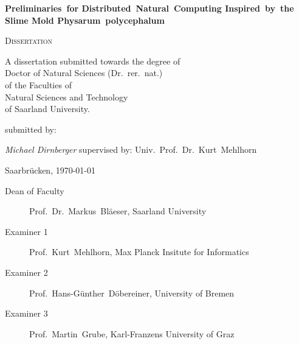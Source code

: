 
\begin{titlepage}
	\centering
	\vfill

	{\huge\bfseries Preliminaries~for Distributed~Natural~Computing Inspired~by~the Slime Mold Physarum~polycephalum\par}


	\vfill

	{\scshape\Large Dissertation}
	\vfill



	{\large A dissertation submitted towards the degree of\\ 
	Doctor of Natural Sciences (Dr.~rer.~nat.)\\
	of the Faculties of\\
	Natural Sciences and Technology\\
	of Saarland University.}
	
	\vfill
	submitted by:
	\vfill

	{\Large\itshape Michael Dirnberger}
	\vfill
	supervised by:
	\vfill
	Univ.~Prof.~Dr.~Kurt~Mehlhorn

	\vfill

	{\large Saarbr\"ucken, \today}
\end{titlepage}


 \begin{description}
 	\item[Dean of Faculty] Prof.~Dr.~Markus~Bl\"aeser, Saarland University
	\item[Examiner 1] Prof.~Kurt~Mehlhorn, Max Planck Insitute for Informatics
	\item[Examiner 2] Prof.~Hans-G\"unther~D\"obereiner, University of Bremen
	\item[Examiner 3] Prof.~Martin~Grube, Karl-Franzens University of Graz
\end{description}


